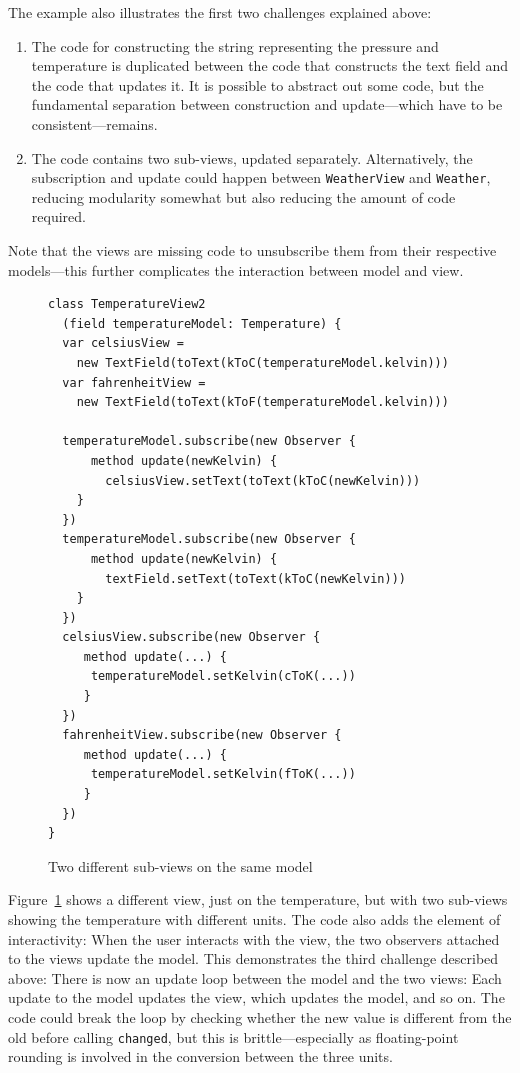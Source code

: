 \documentclass[sigplan,screen]{acmart}
\begin{document}
The example also illustrates the first two challenges explained above:
%
\begin{enumerate}
\item The code for constructing the string representing the pressure
  and temperature is duplicated between the code that constructs the
  text field and the code that updates it.  It is possible to abstract
  out some code, but the fundamental separation between construction
  and update---which have to be consistent---remains.
\item The code contains two sub-views, updated separately.
  Alternatively, the subscription and update could happen between
  \texttt{WeatherView} and \texttt{Weather}, reducing modularity
  somewhat but also reducing the amount of code required.
\end{enumerate}
%
Note that the views are missing code to unsubscribe them from their
respective models---this further complicates the interaction between
model and view.

\begin{figure}[tb]
\begin{verbatim}
class TemperatureView2
  (field temperatureModel: Temperature) {
  var celsiusView =
    new TextField(toText(kToC(temperatureModel.kelvin)))
  var fahrenheitView =
    new TextField(toText(kToF(temperatureModel.kelvin)))

  temperatureModel.subscribe(new Observer {
      method update(newKelvin) {
        celsiusView.setText(toText(kToC(newKelvin)))
    }
  })
  temperatureModel.subscribe(new Observer {
      method update(newKelvin) {
        textField.setText(toText(kToC(newKelvin)))
    }
  })
  celsiusView.subscribe(new Observer {
     method update(...) {
      temperatureModel.setKelvin(cToK(...))
     }
  })
  fahrenheitView.subscribe(new Observer {
     method update(...) {
      temperatureModel.setKelvin(fToK(...))
     }
  })
}
\end{verbatim}
  \caption{Two different sub-views on the same model}
  \label{fig:temperature-view2}
\end{figure}
%
Figure~\ref{fig:temperature-view2} shows a different view, just on the
temperature, but with two sub-views showing the temperature with
different units.  The code also adds the element of interactivity:
When the user interacts with the view, the two observers attached to
the views update the model.  This demonstrates the third challenge
described above: There is now an update loop between the model and
the two views: Each update to the model updates the view, which
updates the model, and so on.  The code could break the loop by
checking whether the new value is different from the old before
calling \texttt{changed}, but this is brittle---especially as
floating-point rounding is involved in the conversion between the
three units.
\end{document}
